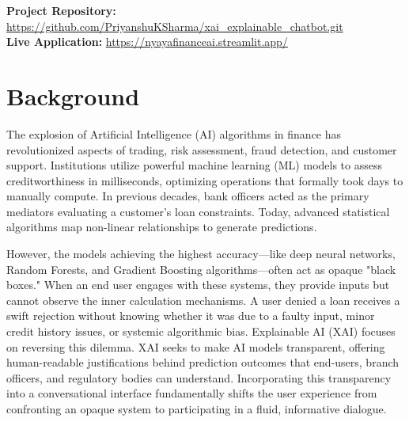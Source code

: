 \documentclass[12pt,a4paper]{report}
\begin{document}
\begin{tcolorbox}[colback=white,colframe=gray!50,arc=2pt,boxrule=1pt,left=5pt,right=5pt,top=5pt,bottom=5pt]
    \textbf{Project Repository:} \url{https://github.com/PriyanshuKSharma/xai_explainable_chatbot.git} \\[0.15cm]
    \textbf{Live Application:} \url{https://nyayafinanceai.streamlit.app/}
\end{tcolorbox}

\vspace{0.3cm}

\section{Background}
The explosion of Artificial Intelligence (AI) algorithms in finance has revolutionized aspects of trading, risk assessment, fraud detection, and customer support. Institutions utilize powerful machine learning (ML) models to assess creditworthiness in milliseconds, optimizing operations that formally took days to manually compute. In previous decades, bank officers acted as the primary mediators evaluating a customer's loan constraints. Today, advanced statistical algorithms map non-linear relationships to generate predictions.

However, the models achieving the highest accuracy---like deep neural networks, Random Forests, and Gradient Boosting algorithms---often act as opaque "black boxes." When an end user engages with these systems, they provide inputs but cannot observe the inner calculation mechanisms. A user denied a loan receives a swift rejection without knowing whether it was due to a faulty input, minor credit history issues, or systemic algorithmic bias. Explainable AI (XAI) focuses on reversing this dilemma. XAI seeks to make AI models transparent, offering human-readable justifications behind prediction outcomes that end-users, branch officers, and regulatory bodies can understand. Incorporating this transparency into a conversational interface fundamentally shifts the user experience from confronting an opaque system to participating in a fluid, informative dialogue.
\end{document}
